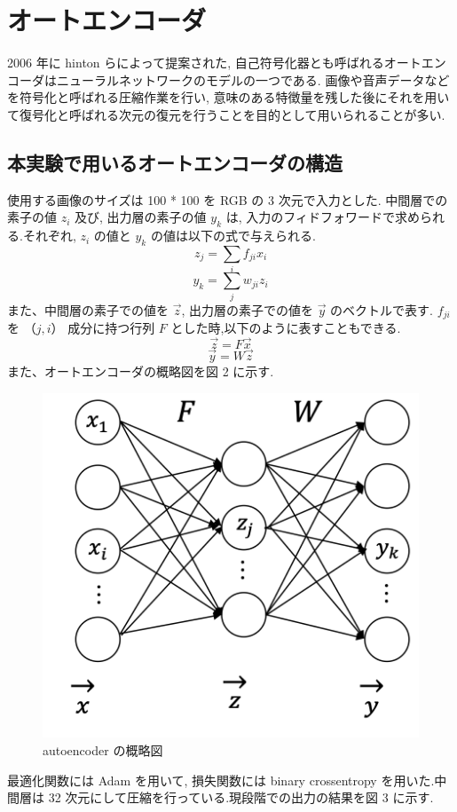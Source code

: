 \section{オートエンコーダ}
2006 年に hinton らによって提案された, 自己符号化器とも呼ばれるオートエンコーダはニューラルネットワークのモデルの一つである. 画像や音声データなどを符号化と呼ばれる圧縮作業を行い, 意味のある特徴量を残した後にそれを用いて復号化と呼ばれる次元の復元を行うことを目的として用いられることが多い.
\subsection{本実験で用いるオートエンコーダの構造}
使用する画像のサイズは 100 * 100 を RGB の 3 次元で入力とした.  中間層での素子の値 $z_i$ 及び, 出力層の素子の値 $y_k$ は, 入力のフィドフォワードで求められる.それぞれ, $z_i$ の値と $y_k$ の値は以下の式で与えられる.
\begin{equation}
z_j = \sum_if_{ji}x_i
\end{equation}
\begin{equation}
y_k = \sum_jw_{ji}z_i
\end{equation}
また、中間層の素子での値を $\vec{z}$, 出力層の素子での値を $\vec{y}$ のベクトルで表す.
$f_{ji}$ を $（j,i）$ 成分に持つ行列 $F$ とした時,以下のように表すこともできる.
\begin{equation}
\vec{z} = F\vec{x}
\end{equation}
\begin{equation}
\vec{y} = W\vec{z}
\end{equation}
また、オートエンコーダの概略図を図 2 に示す.
\begin{figure}[hb]
\begin{center}
\includegraphics[scale=0.25]{auto_1.png}
\caption{autoencoder の概略図}
\end{center}
\end{figure}
最適化関数には Adam を用いて, 損失関数には binary crossentropy を用いた.中間層は 32 次元にして圧縮を行っている.現段階での出力の結果を図 3 に示す.

